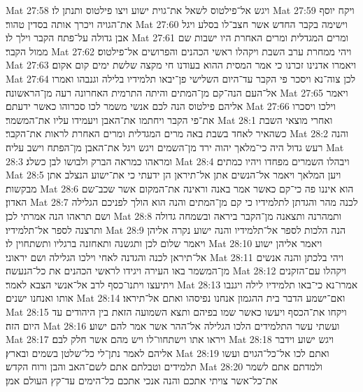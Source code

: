 Mat 27:58  ויגש אל־פילטוס לשאל את־גוית ישוע ויצו פילטוס ותנתן לו׃
Mat 27:59  ויקח יוסף את־הגויה ויכרך אותה בסדין טהור׃
Mat 27:60  וישימה בקבר החדש אשר חצב־לו בסלע ויגל אבן גדולה על־פתח הקבר וילך לו׃
Mat 27:61  ומרים המגדלית ומרים האחרת היו ישבות שם ממול הקבר׃
Mat 27:62  ויהי ממחרת ערב השבת ויקהלו ראשי הכהנים והפרושים אל־פילטוס׃
Mat 27:63  ויאמרו אדנינו זכרנו כי אמר המסית ההוא בעודנו חי מקצה שלשת ימים קום אקום׃
Mat 27:64  לכן צוה־נא ויסכר פי הקבר עד־היום השלישי פן־יבאו תלמידיו בלילה וגנבהו ואמרו אל־העם הנה־קם מן־המתים והיתה התרמית האחרונה רעה מן־הראשונה׃
Mat 27:65  ויאמר אליהם פילטוס הנה לכם אנשי משמר לכו סכרוהו כאשר ידעתם׃
Mat 27:66  וילכו ויסכרו את־פי הקבר ויחתמו את־האבן ויעמידו עליו את־המשמר׃
Mat 28:1  ואחרי מוצאי השבת כשהאיר לאחד בשבת באה מרים המגדלית ומרים האחרת לראות את־הקבר׃
Mat 28:2  והנה רעש גדול היה כי־מלאך יהוה ירד מן־השמים ויגש ויגל את־האבן מן־הפתח וישב עליה׃
Mat 28:3  ומראהו כמראה הברק ולבושו לבן כשלג׃
Mat 28:4  ויבהלו השמרים מפחדו ויהיו כמתים׃
Mat 28:5  ויען המלאך ויאמר אל־הנשים אתן אל־תיראן הן ידעתי כי את־ישוע הנצלב אתן מבקשות׃
Mat 28:6  הוא איננו פה כי־קם כאשר אמר באנה וראינה את־המקום אשר שכב־שם האדון׃
Mat 28:7  לכנה מהר והגדתן לתלמידיו כי קם מן־המתים והנה הוא הולך לפניכם הגלילה ושם תראהו הנה אמרתי לכן׃
Mat 28:8  ותמהרנה ותצאנה מן־הקבר ביראה ובשמחה גדולה ותרצנה לספר אל־תלמידיו׃
Mat 28:9  הנה הלכות לספר אל־תלמידיו והנה ישוע נקרה אליהן ויאמר שלום לכן ותגשנה ותאחזנה ברגליו ותשתחוין לו׃
Mat 28:10  ויאמר אליהן ישוע אל־תיראן לכנה והגדנה לאחי וילכו הגלילה ושם יראוני׃
Mat 28:11  ויהי בלכתן והנה אנשים מן־המשמר באו העירה ויגידו לראשי הכהנים את כל־הנעשה׃
Mat 28:12  ויקהלו עם־הזקנים ויתיעצו ויתנו־כסף לרב אל־אנשי הצבא לאמר׃
Mat 28:13  אמרו־נא כי־באו תלמידיו לילה ויגנבו אותו ואנחנו ישנים׃
Mat 28:14  ואם־ישמע הדבר בית ההגמון אנחנו נפיסהו ואתם אל־תיראו׃
Mat 28:15  ויקחו את־הכסף ויעשו כאשר שמו בפיהם ותצא השמועה הזאת בין היהודים עד היום הזה׃
Mat 28:16  ועשתי עשר התלמידים הלכו הגלילה אל־ההר אשר אמר להם ישוע׃
Mat 28:17  ויראו אתו וישתחוו־לו ויש מהם אשר חלק לבם׃
Mat 28:18  ויגש ישוע וידבר אליהם לאמר נתן־לי כל־שלטן בשמים ובארץ׃
Mat 28:19  ואתם לכו אל־כל־הגוים ועשו תלמידים וטבלתם אתם לשם־האב והבן ורוח הקדש׃
Mat 28:20  ולמדתם אתם לשמר את־כל־אשר צויתי אתכם והנה אנכי אתכם כל־הימים עד־קץ העולם אמן׃


